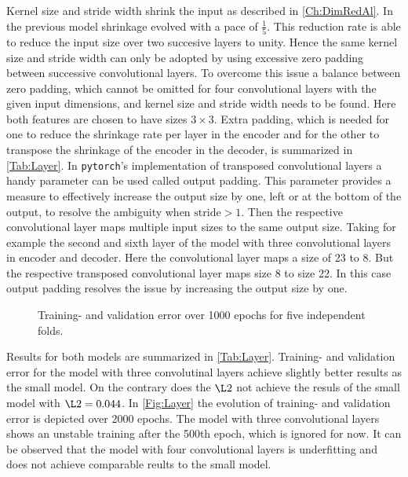 Kernel size and stride width shrink the input as described in \cref{Ch:DimRedAl}. In the previous model shrinkage evolved with a pace of \(\frac{1}{5}\). This reduction rate is able to reduce the input size over two succesive layers to unity. Hence the same kernel size and stride width can only be adopted by using excessive zero padding between successive convolutional layers. To overcome this issue a balance between zero padding, which cannot be omitted for four convolutional layers with the given input dimensions, and kernel size and stride width needs to be found. Here both features are chosen to have sizes \(3\times 3\). Extra padding, which is needed for one to reduce the shrinkage rate per layer in the encoder and for the other to transpose the shrinkage of the encoder in the decoder, is summarized in \cref{Tab:Layer}. In \texttt{pytorch}'s implementation of transposed convolutional layers a handy parameter can be used called output padding. This parameter provides a measure to effectively increase the output size by one, left or at the bottom of the output, to resolve the ambiguity when \(\text{stride}>1\). Then the respective convolutional layer maps multiple input sizes to the same output size. Taking for example the second and sixth layer of the model with three convolutional layers in encoder and decoder. Here the convolutional layer maps a size of 23 to 8. But the respective transposed convolutional layer maps size 8 to size 22. In this case output padding resolves the issue by increasing the output size by one.         
\begin{center}
	\begin{figure}[H]
		
		\label{Fig:kFold}
		\caption{Training- and validation error over 1000 epochs for five independent folds.}
	\end{figure}
\end{center}
Results for both models are summarized in \cref{Tab:Layer}. Training- and validation error for the model with three convolutinal layers achieve slightly better results as the small model. On the contrary does the \(\L2\) not achieve the resuls of the small model with \(\L2=0.044\). In \cref{Fig:Layer} the evolution of training- and validation error is depicted over 2000 epochs. The model with three convolutional layers shows an unstable training after the 500th epoch, which is ignored for now. It can be observed that the model with four convolutional layers is underfitting and does not achieve comparable reults to the small model.\\  
 
